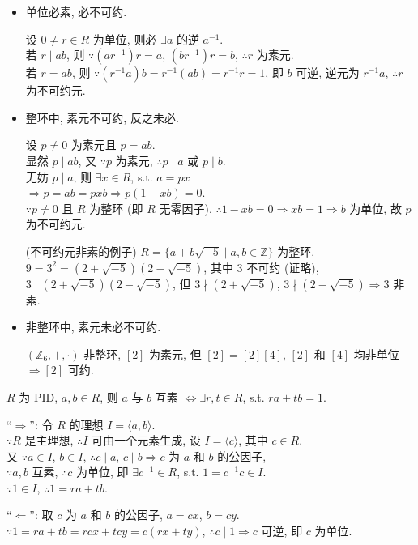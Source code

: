 \documentclass{note}
\begin{document}
\begin{itemize}
    \item 单位必素, 必不可约.
    \begin{pf}
        设 $0\neq r\in R$ 为单位, 则必 $\exists a$ 的逆 $a^{-1}$.\\
        若 $r\mid ab$, 则 $\because(ar^{-1})r=a$, $(br^{-1})r=b$, $\therefore r$ 为素元.\\
        若 $r=ab$, 则 $\because(r^{-1}a)b=r^{-1}(ab)=r^{-1}r=1$, 即 $b$ 可逆, 逆元为 $r^{-1}a$, $\therefore r$ 为不可约元.
    \end{pf}
    \item 整环中, 素元不可约, 反之未必.
    \begin{pf}
        设 $p\neq 0$ 为素元且 $p=ab$.\\
        显然 $p\mid ab$, 又 $\because p$ 为素元, $\therefore p\mid a$ 或 $p\mid b$.\\
        无妨 $p\mid a$, 则 $\exists x\in R$, s.t. $a=px$\\
        $\Longrightarrow p=ab=pxb\Longrightarrow p(1-xb)=0$.\\
        $\because p\neq 0$ 且 $R$ 为整环 (即 $R$ 无零因子), $\therefore 1-xb=0\Longrightarrow xb=1\Longrightarrow b$ 为单位, 故 $p$ 为不可约元.
    \end{pf}
    \begin{eg}(不可约元非素的例子)
        $R=\{a+b\sqrt{-5}\mid a,b\in\mathbb{Z}\}$ 为整环.\\
        $9=3^2=(2+\sqrt{-5})(2-\sqrt{-5})$, 其中 $3$ 不可约 (证略), $3\mid(2+\sqrt{-5})(2-\sqrt{-5})$, 但 $3\nmid(2+\sqrt{-5})$, $3\nmid(2-\sqrt{-5})\Longrightarrow 3$ 非素.
    \end{eg}
    \item 非整环中, 素元未必不可约.
    \begin{eg}
        $(\mathbb{Z}_6,+,\cdot)$ 非整环, $[2]$ 为素元, 但 $[2]=[2][4]$, $[2]$ 和 $[4]$ 均非单位 $\Longrightarrow[2]$ 可约.
    \end{eg}
\end{itemize}

\begin{thm}[(课本定理 0.29)]
    $R$ 为 PID, $a,b\in R$, 则 $a$ 与 $b$ 互素 $\Longleftrightarrow\exists r,t\in R$, s.t. $ra+tb=1$.
\end{thm}
\begin{pf}
    ``$\Longrightarrow$'': 令 $R$ 的理想 $I=\langle a,b\rangle$.\\
    $\because R$ 是主理想, $\therefore I$ 可由一个元素生成, 设 $I=\langle c\rangle$, 其中 $c\in R$.\\
    又 $\because a\in I$, $b\in I$, $\therefore c\mid a$, $c\mid b\Longrightarrow c$ 为 $a$ 和 $b$ 的公因子,\\
    $\because a,b$ 互素, $\therefore c$ 为单位, 即 $\exists c^{-1}\in R$, s.t. $1=c^{-1}c\in I$.\\
    $\because 1\in I$, $\therefore 1=ra+tb$.

    ``$\Longleftarrow$'': 取 $c$ 为 $a$ 和 $b$ 的公因子, $a=cx$, $b=cy$.\\
    $\because 1=ra+tb=rcx+tcy=c(rx+ty)$, $\therefore c\mid 1\Longrightarrow c$ 可逆, 即 $c$ 为单位.
\end{pf}
\end{document}
